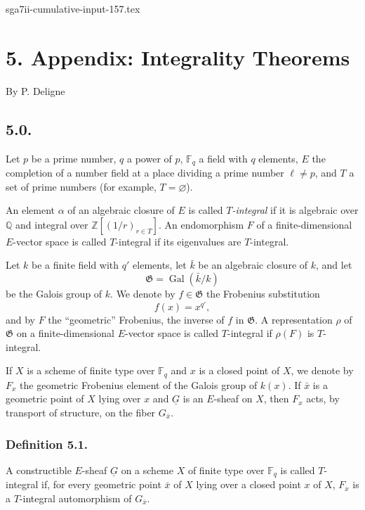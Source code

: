 \begin{filecontents*}{sga7ii-cumulative-input-157.tex}
\section*{5. Appendix: Integrality Theorems}

\begin{center}
By P. Deligne
\end{center}

\subsection*{5.0.}
Let $p$ be a prime number, $q$ a power of $p$, $\mathbb F_q$ a field with
$q$ elements, $E$ the completion of a number field at a place dividing a
prime number $\ell\ne p$, and $T$ a set of prime numbers (for example,
$T=\varnothing$).

An element $\alpha$ of an algebraic closure of $E$ is called
\emph{$T$-integral} if it is algebraic over $\mathbb Q$ and integral over
$\mathbb Z[(1/r)_{r\in T}]$.  An endomorphism $F$ of a finite-dimensional
$E$-vector space is called $T$-integral if its eigenvalues are $T$-integral.

Let $k$ be a finite field with $q'$ elements, let $\bar k$ be an algebraic
closure of $k$, and let
\[
\mathfrak G=\operatorname{Gal}(\bar k/k)
\]
be the Galois group of $k$.  We denote by $f\in\mathfrak G$ the Frobenius
substitution
\[
f(x)=x^{q'},
\]
and by $F$ the ``geometric'' Frobenius, the inverse of $f$ in $\mathfrak G$.
A representation $\rho$ of $\mathfrak G$ on a finite-dimensional
$E$-vector space is called $T$-integral if $\rho(F)$ is $T$-integral.

If $X$ is a scheme of finite type over $\mathbb F_q$ and $x$ is a closed
point of $X$, we denote by $F_x$ the geometric Frobenius element of the
Galois group of $k(x)$.  If $\bar x$ is a geometric point of $X$ lying over
$x$ and $\underline G$ is an $E$-sheaf on $X$, then $F_x$ acts, by transport
of structure, on the fiber $G_{\bar x}$.

\subsubsection*{Definition 5.1.}
A constructible $E$-sheaf $\underline G$ on a scheme $X$ of finite type over
$\mathbb F_q$ is called $T$-integral if, for every geometric point $\bar x$
of $X$ lying over a closed point $x$ of $X$, $F_x$ is a $T$-integral
automorphism of $G_{\bar x}$.


\end{filecontents*}
